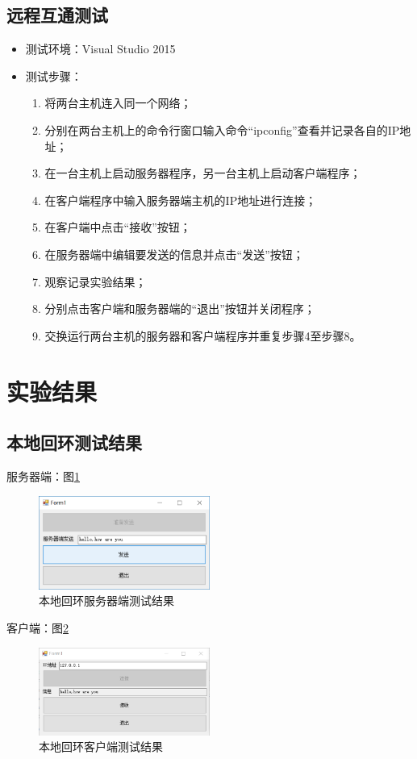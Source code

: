 \documentclass[a4paper]{ctexrep}
\begin{document}
\begin{spacing}{1.5}
\subsection{远程互通测试}
\begin{itemize}
	\item 测试环境：Visual Studio 2015
	\item 测试步骤：
	\begin{enumerate}
		\item 将两台主机连入同一个网络；
		\item 分别在两台主机上的命令行窗口输入命令“ipconfig”查看并记录各自的IP地址；
		\item 在一台主机上启动服务器程序，另一台主机上启动客户端程序；
		\item 在客户端程序中输入服务器端主机的IP地址进行连接；
		\item 在客户端中点击“接收”按钮；
		\item 在服务器端中编辑要发送的信息并点击“发送”按钮；
		\item 观察记录实验结果；
		\item 分别点击客户端和服务器端的“退出”按钮并关闭程序；
		\item 交换运行两台主机的服务器和客户端程序并重复步骤4至步骤8。
	\end{enumerate}
\end{itemize}

\section{实验结果}
\subsection{本地回环测试结果}
服务器端：图\ref{localserver}
\begin{figure}[htbp]
	\centering
	\includegraphics [width=0.5\textwidth]{figure//localserver.png}
	\caption{本地回环服务器端测试结果}\label{localserver}
\end{figure}

客户端：图\ref{localclient}
\begin{figure}[htbp]
	\centering
	\includegraphics [width=0.5\textwidth]{figure//localclient.png}
	\caption{本地回环客户端测试结果}\label{localclient}
\end{figure}


\end{spacing}
\end{document}
